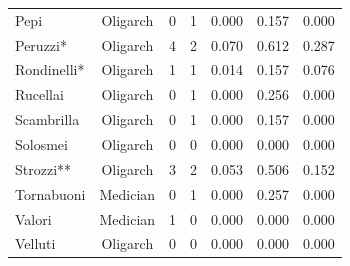 \documentclass[11pt,fleqn]{article}
\begin{document}
\begin{table}[h]
\begin{center}
\begin{tabular}{|l|c|ccccc|}
Pepi            & Oligarch	& 0 & 1 & 0.000 & 0.157 & 0.000      \\
Peruzzi*        & Oligarch	& 4 & 2 & 0.070 & 0.612 & 0.287      \\
Rondinelli*     & Oligarch	& 1 & 1 & 0.014 & 0.157 & 0.076      \\
Rucellai        & Oligarch	& 0 & 1 & 0.000 & 0.256 & 0.000      \\
Scambrilla      & Oligarch	& 0 & 1 & 0.000 & 0.157 & 0.000      \\
Solosmei        & Oligarch	& 0 & 0 & 0.000 & 0.000 & 0.000      \\
Strozzi**       & Oligarch	& 3 & 2 & 0.053 & 0.506 & 0.152      \\
Tornabuoni      & Medician	& 0 & 1 & 0.000 & 0.257 & 0.000      \\
Valori          & Medician	& 1 & 0 & 0.000 & 0.000 & 0.000      \\
Velluti         & Oligarch	& 0 & 0 & 0.000 & 0.000 & 0.000      \\
\bottomrule
\end{tabular}
\label{tabFlorenceA}
\end{center}
\end{table}
\end{document}

